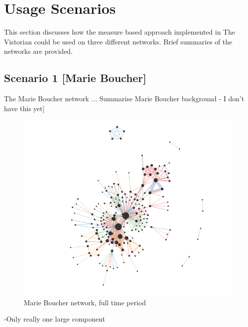 
\chapter{Usage Scenarios}

This section discusses how the measure based approach implemented in The Vistorian could be used on three different networks. Brief summaries of the networks are provided.


\section{Scenario 1 [Marie Boucher]}
The Marie Boucher network \cite{dufournaud2017analyse}...
Summarise Marie Boucher background - I don't have this yet]

\begin{figure}[h!]
  \begin{center}
  \includegraphics[trim={0 0 0 0}, width=140mm]{./Figures/marieBoucherFull.png}
  \caption{Marie Boucher network, full time period}
  \label{fig:marieBoucherFull}
  \end{center}
\end{figure}

-Only really one large component

